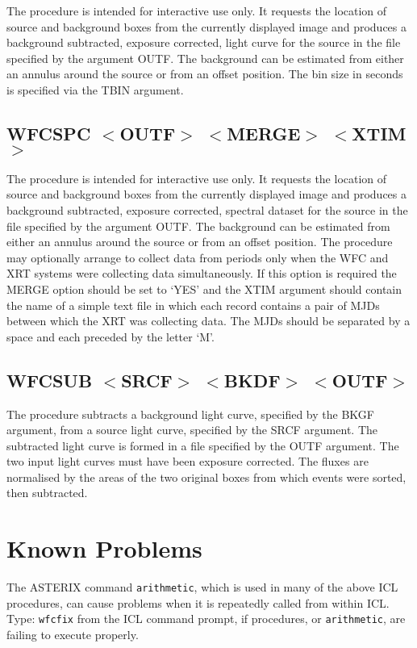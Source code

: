 The procedure is intended for interactive use only. It requests the
location of source and background boxes from the currently displayed
image and produces a background subtracted, exposure corrected, light
curve for the source in the file specified by the argument OUTF. The
background can be estimated from either an annulus around the source or
from an offset position. The bin size in seconds is specified via the
TBIN argument.

\subsection{WFCSPC $<$OUTF$>$ $<$MERGE$>$ $<$XTIM$>$}
\label{sec:procedures:wfcspc}

The procedure is intended for interactive use only. It requests the
location of source and background boxes from the currently displayed
image and produces a background subtracted, exposure corrected,
spectral dataset for the source in the file specified by the argument
OUTF.  The background can be estimated from either an annulus around
the source or from an offset position. The procedure may optionally
arrange to collect data from periods only when the WFC and XRT systems
were collecting data simultaneously. If this option is required the
MERGE option should be set to `YES' and the XTIM argument should
contain the name of a simple text file in which each record contains a
pair of MJDs between which the XRT was collecting data. The MJDs should
be separated by a space and each preceded by the letter `M'.

\subsection{WFCSUB $<$SRCF$>$ $<$BKDF$>$ $<$OUTF$>$}
\label{sec:procedures:wfcsub}

The procedure subtracts a background light curve, specified by the
BKGF argument, from a source light curve, specified by the SRCF
argument. The subtracted light curve is formed in a file specified
by the OUTF argument. The two input light curves must have been
exposure corrected. The fluxes are normalised by the areas of the
two original boxes from which events were sorted, then subtracted.

\section{Known Problems}
\label{sec:problems}

The ASTERIX command {\tt arithmetic}, which is used in many of the
above ICL procedures, can cause problems when it is repeatedly called
from within ICL.  Type: {\tt wfcfix} from the ICL command prompt, if
procedures, or {\tt arithmetic}, are failing to execute properly.


